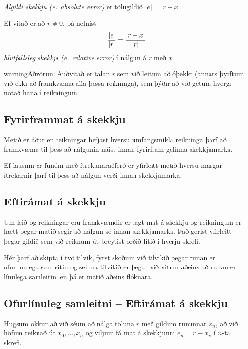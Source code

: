 \documentclass[letterpaper,10pt,icelandic]{sphinxmanual}
\begin{document}
\emph{Algildi skekkju (e. absolute error)} er tölugildið \(|e|=|r-x|\)

Ef vitað er að \(r\neq 0\), þá nefnist
\begin{gather}
\begin{split}\dfrac{|e|}{|r|}=\dfrac{|r-x|}{|r|}\end{split}\notag
\end{gather}
\emph{hlutfallsleg skekkja (e. relative error)} í nálgun á \(r\) með
\(x\).

\begin{notice}{warning}{Aðvörun:}
Auðvitað er talan \(r\) sem við leitum að óþekkt (annars
þyrftum við ekki að framkvæma alla þessa reikninga), sem þýðir að við
getum hvergi notað hana í reikningum.
\end{notice}


\subsection{Fyrirframmat á skekkju}
\label{kafli01:index-6}\label{kafli01:fyrirframmat-a-skekkju}
Metið er áður en reikningar hefjast hversu umfangsmikla reikninga þarf
að framkvæma til þess að nálgunin náist innan fyrirfram gefinna
skekkjumarka.

Ef lausnin er fundin með ítrekunaraðferð er yfirleitt metið hversu
margar ítrekarnir þarf til þess að nálgun verði innan skekkjumarka.


\subsection{Eftirámat á skekkju}
\label{kafli01:index-7}\label{kafli01:eftiramat-a-skekkju}
Um leið og reikningar eru framkvæmdir er lagt mat á skekkju og
reikningum er hætt þegar matið segir að nálgun sé innan skekkjumarka.
Það gerist yfirleitt þegar gildið sem við reiknum út breytist orðið
lítið í hverju skrefi.

Hér þarf að skipta í tvö tilvik, fyrst skoðum við tilvikið þegar runan er ofurlínulega samleitin
og seinna tilvikið er þegar við vitum aðeins að runan er línulega samleitin, en
þá er matið aðeins flóknara.


\subsection{Ofurlínuleg samleitni -- Eftirámat á skekkju}
\label{kafli01:index-8}\label{kafli01:ofurlinuleg-samleitni-eftiramat-a-skekkju}
Hugsum okkur að við séum að nálga töluna \(r\) með gildum rununnar
\(x_n\), að við höfum reiknað út \(x_0,\dots,x_n\) og viljum fá
mat á skekkjunni \(e_n=r-x_n\) í \(n\)-ta skrefi.
\end{document}
